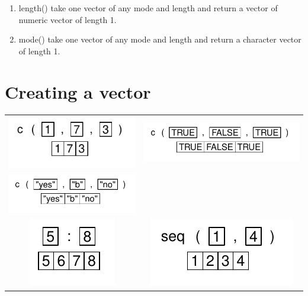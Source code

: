 \documentclass[pdflatex]{article}
\begin{document}
\begin{enumerate}
\item length() take one vector of any mode and length and return a vector of numeric vector of length 1.
\item mode() take one vector of any mode and length and return a character vector of length 1.
\end{enumerate}

\section{Creating a vector}

\begin{tabular}{cc}
\includegraphics{c_1} & \includegraphics{c_2}\\
\includegraphics{c_3} & \\
\includegraphics{operator_sequence} & \includegraphics{seq}\\

\end{tabular}
\end{document}
